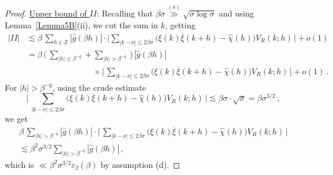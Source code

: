 \documentclass[10pt,a4paper]{amsart}
\newcommand{\bZ}{\mathbb Z}
\def\ep{{\varepsilon}}
\begin{document}
\begin{proof}
\medskip\noindent\underline{Upper bound of $II$}:
Recalling that $\beta\sigma \stackrel{(a)}\gg \sqrt{\sigma\log\sigma}$
and using Lemma~\ref{Lemma5B}(ii), we cut the sum in $k$, getting
\begin{align*}
|II| &\lesssim \beta\, \sum_{h\in\bZ} |\widehat{g}(\beta h)| \cdot
\bigl| \sum_{|k-\nu|\le 2\beta\sigma}
\bigl( \xi(k)\bar\xi(k+h) - \widehat{\chi}(h) \bigr) V_R(k; h)\, \bigr| + o(1) \\
&= \beta\, \bigl(\, \sum_{|h|\le \beta^{-q}} + \sum_{|h|>\beta^{-q}} \,\bigr)\,
|\widehat{g}(\beta h)| \\ &\qquad\qquad\qquad\qquad \times
\bigl|\, \sum_{|k-\nu|\le 2\beta\sigma}
\bigl( \xi(k)\bar\xi(k+h) - \widehat{\chi}(h) \bigr) V_R(k; h) \,\bigr| + o(1)\,.
\end{align*}
For $|h|>\beta^{-q}$, using the crude estimate
\[
\bigl|\, \sum_{|k-\nu|\le 2\beta\sigma}
\bigl( \xi(k)\bar\xi(k+h) - \widehat{\chi}(h) \bigr) V_R(k; h) \,\bigr|
\lesssim \beta\sigma \cdot \sqrt{\sigma} = \beta\sigma^{3/2}\,,
\]
we get
\begin{multline*}
\beta\, \sum_{|h|> \beta^{-q}}
|\widehat{g}(\beta h)| \cdot
\bigl|\, \sum_{|k-\nu|\le 2\beta\sigma}
\bigl( \xi(k)\bar\xi(k+h) - \widehat{\chi}(h) \bigr) V_R(k; h) \,\bigr|
\\
\lesssim \beta^2\sigma^{3/2} \sum_{|h|> \beta^{-q}}
|\widehat{g}(\beta h)|\,,
\end{multline*}
which is $\ll \beta^2\sigma^{3/2}\ep_2(\beta)$ by assumption (d).


\end{proof}
\end{document}
